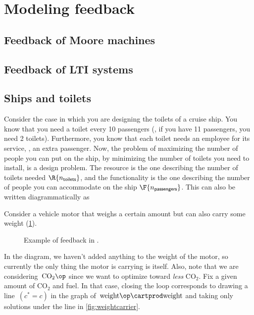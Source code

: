 
\section{Modeling feedback}
\label{sec:modeling-feedback}


\subsection{Feedback of Moore machines}


\subsection{Feedback of LTI systems}


\subsection{Ships and toilets}

Consider the case in which you are designing the toilets of a cruise ship.
You know that you need a toilet every 10 passengers (\ie, if you have 11 passengers, you need 2 toilets).
Furthermore, you know that each toilet needs an employee for its service, \ie, an extra passenger.
Now, the problem of maximizing the number of people you can put on the ship, by minimizing the number of toilets you need to install, is a design problem.
The resource  is the one describing the number of toilets needed $\R{n_\mathsf{toilets}}$, and the functionality  is the one describing the number of people you can accommodate on the ship $\F{n_\mathsf{passengers}}$.
This can also be written diagrammatically as


\begin{example}
    Consider a vehicle motor that weighs a certain amount but can also carry some weight (\cref{fig:examplefeedback}).
    \begin{figure}[h!]
        \centering
        \caption{Example of feedback in .}
        \label{fig:examplefeedback}
    \end{figure}
    In the diagram, we haven't added anything to the weight of the motor, so currently the only thing the motor is carrying is itself.
    Also, note that we are considering~$\text{CO}_2\op$ since we want to optimize toward \emph{less} CO$_2$.
    Fix a given amount of CO$_2$ and fuel.
    In that case, closing the loop corresponds to drawing a line~$(c^\ast = c)$ in the graph of~$\text{weight}\op \cartprod \text{weight}$ and taking only solutions under the line in \cref{fig:weightcarrier}.
\end{example}


